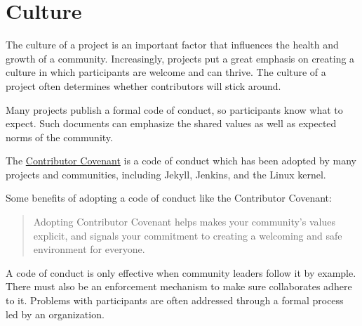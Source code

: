


\chapter{Culture}

The culture of a project is an important factor that influences the health and growth of a community.  Increasingly, projects put a great emphasis on creating a culture in which participants are welcome and can thrive.  The culture of a project often determines whether contributors will stick around.

Many projects publish a formal code of conduct, so participants know what to expect.  Such documents can emphasize the shared values as well as expected norms of the community.

The \href{https://www.contributor-covenant.org/}{Contributor Covenant} is a code of conduct which has been adopted by many projects and communities, including Jekyll, Jenkins, and the Linux kernel.

\begin{kaobox}[frametitle=Contributor Covenant]

Some benefits of adopting a code of conduct like the Contributor Covenant:

\begin{quote}

Adopting Contributor Covenant helps makes your community's values explicit, and signals your commitment to creating a welcoming and safe environment for everyone.

\end{quote}

\end{kaobox}

A code of conduct is only effective when community leaders follow it by example.  There must also be an enforcement mechanism to make sure collaborates adhere to it.  Problems with participants are often addressed through a formal process led by an organization.

